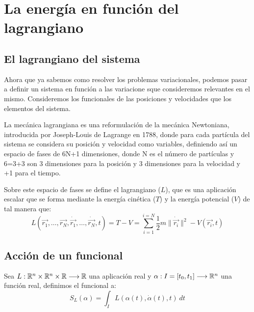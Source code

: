 \section{La energía en función del lagrangiano}\label{sec:la-energia-en-funcion-del-lagrangiano}


\subsection{El lagrangiano del sistema}
Ahora que ya sabemos como resolver los problemas variacionales, podemos pasar a definir un sistema en función a las variacione sque consideremos relevantes en el mismo.
Consideremos los funcionales de las posiciones y velocidades que los elementos del sistema.

La mecánica lagrangiana es una reformulación de la mecánica Newtoniana, introducida por Joseph-Louis de Lagrange en 1788, donde para cada partícula del sistema se considera su posición y velocidad como variables, definiendo así un espacio de fases de 6N+1 dimensiones, donde N es el número de partículas y 6=3+3 son 3 dimensiones para la posición y 3 dimensiones para la velocidad y +1 para el tiempo.

Sobre este espacio de fases se define el lagrangiano ($L$), que es una aplicación escalar que se forma mediante la energía cinética ($T$) y la energía potencial ($V$) de tal manera que:
\begin{equation}
	\label{eq:lagrangiano_clasico}
	L(\vec{r_1},\dots,\vec{r_N},\dot{\vec{r_1}},\dots,\dot{\vec{r_N}},t)=T-V=\sum\limits_{i=1}^{i=N} \frac{1}{2}m\|\dot{\vec{r_i}}\|^2-V(\vec{r_i},t)
\end{equation}

\subsection{Acción de un funcional}
	Sea $L:\mathbb{R}^n\times\mathbb{R}^n\times\mathbb{R}\longrightarrow \mathbb{R}$ una aplicación real y $\alpha:I=[t_0, t_1]\longrightarrow \mathbb{R}^n$ una función real, definimos el funcional  a:
	\begin{equation}
		\label{eq:accion}
		S_L(\alpha) = \int_{I}L(\alpha(t), \dot{\alpha}(t), t)\ dt
	\end{equation}

